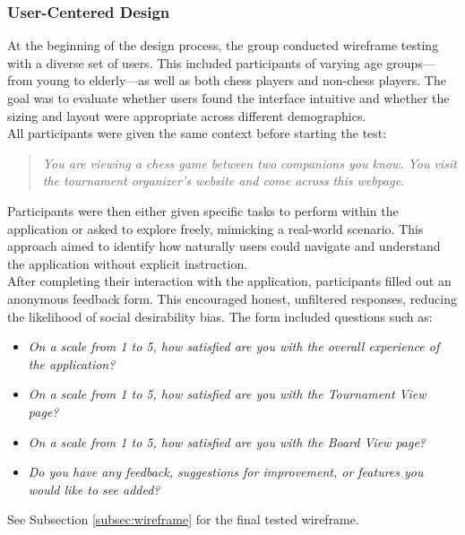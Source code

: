 \subsubsection*{User-Centered Design}
\label{subsubsec:user-centered-design}

At the beginning of the design process, the group conducted wireframe testing with a diverse set of users. This included participants of varying age groups—from young to elderly—as well as both chess players and non-chess players. The goal was to evaluate whether users found the interface intuitive and whether the sizing and layout were appropriate across different demographics. \\

All participants were given the same context before starting the test: 

\begin{quote}
\textit{You are viewing a chess game between two companions you know. You visit the tournament organizer's website and come across this webpage.}
\end{quote}

Participants were then either given specific tasks to perform within the application or asked to explore freely, mimicking a real-world scenario. This approach aimed to identify how naturally users could navigate and understand the application without explicit instruction. \\

After completing their interaction with the application, participants filled out an anonymous feedback form. This encouraged honest, unfiltered responses, reducing the likelihood of social desirability bias. The form included questions such as:

\begin{itemize}
    \item \textit{On a scale from 1 to 5, how satisfied are you with the overall experience of the application?}
    \item \textit{On a scale from 1 to 5, how satisfied are you with the Tournament View page?}
    \item \textit{On a scale from 1 to 5, how satisfied are you with the Board View page?}
    \item \textit{Do you have any feedback, suggestions for improvement, or features you would like to see added?}
\end{itemize}

See Subsection \ref{subsec:wireframe} for the final tested wireframe.

